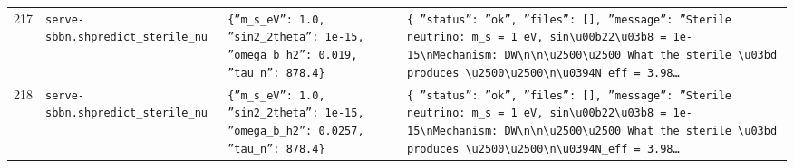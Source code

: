 \documentclass[11pt,a4paper]{article}
\begin{document}
\begin{longtable}{@{}p{}p{}p{}p{}@{}}
217 & \texttt{serve-sbbn.sh}\newline\texttt{predict\_\allowbreak{}sterile\_\allowbreak{}nu} & \texttt{\{''m\_\allowbreak{}s\_\allowbreak{}eV'':\allowbreak{} 1.0,\allowbreak{} ''sin2\_\allowbreak{}2theta'':\allowbreak{} 1e-15,\allowbreak{} ''omega\_\allowbreak{}b\_\allowbreak{}h2'':\allowbreak{} 0.019,\allowbreak{} ''tau\_\allowbreak{}n'':\allowbreak{} 878.4\}\allowbreak{}} & \texttt{\{   ''status'':\allowbreak{} ''ok'',\allowbreak{}   ''files'':\allowbreak{} []\allowbreak{},\allowbreak{}   ''message'':\allowbreak{} ''Sterile neutrino:\allowbreak{} m\_\allowbreak{}s =\allowbreak{} 1 eV,\allowbreak{} sin\textbackslash{}\allowbreak{}u00b22\textbackslash{}\allowbreak{}u03b8 =\allowbreak{} 1e-15\textbackslash{}\allowbreak{}nMechanism:\allowbreak{} DW\textbackslash{}\allowbreak{}n\textbackslash{}\allowbreak{}n\textbackslash{}\allowbreak{}u2500\textbackslash{}\allowbreak{}u2500 What the sterile \textbackslash{}\allowbreak{}u03bd produces \textbackslash{}\allowbreak{}u2500\textbackslash{}\allowbreak{}u2500\textbackslash{}\allowbreak{}n\textbackslash{}\allowbreak{}u0394N\_\allowbreak{}eff =\allowbreak{} 3.98\ldots{}\allowbreak{}} \\
218 & \texttt{serve-sbbn.sh}\newline\texttt{predict\_\allowbreak{}sterile\_\allowbreak{}nu} & \texttt{\{''m\_\allowbreak{}s\_\allowbreak{}eV'':\allowbreak{} 1.0,\allowbreak{} ''sin2\_\allowbreak{}2theta'':\allowbreak{} 1e-15,\allowbreak{} ''omega\_\allowbreak{}b\_\allowbreak{}h2'':\allowbreak{} 0.0257,\allowbreak{} ''tau\_\allowbreak{}n'':\allowbreak{} 878.4\}\allowbreak{}} & \texttt{\{   ''status'':\allowbreak{} ''ok'',\allowbreak{}   ''files'':\allowbreak{} []\allowbreak{},\allowbreak{}   ''message'':\allowbreak{} ''Sterile neutrino:\allowbreak{} m\_\allowbreak{}s =\allowbreak{} 1 eV,\allowbreak{} sin\textbackslash{}\allowbreak{}u00b22\textbackslash{}\allowbreak{}u03b8 =\allowbreak{} 1e-15\textbackslash{}\allowbreak{}nMechanism:\allowbreak{} DW\textbackslash{}\allowbreak{}n\textbackslash{}\allowbreak{}n\textbackslash{}\allowbreak{}u2500\textbackslash{}\allowbreak{}u2500 What the sterile \textbackslash{}\allowbreak{}u03bd produces \textbackslash{}\allowbreak{}u2500\textbackslash{}\allowbreak{}u2500\textbackslash{}\allowbreak{}n\textbackslash{}\allowbreak{}u0394N\_\allowbreak{}eff =\allowbreak{} 3.98\ldots{}\allowbreak{}} \\

\end{longtable}
\end{document}

